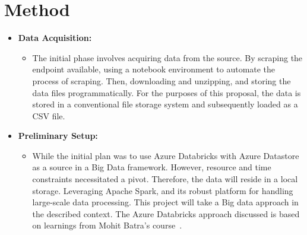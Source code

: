 \documentclass[12pt, a4paper]{article}
\begin{document}
    \section*{Method}
    \label{sec:method}
        \begin{itemize}
            \item \textbf{Data Acquisition:}
            \begin{itemize}
                    \item The initial phase involves acquiring data from the source.\newline
                    By scraping the endpoint available, using a notebook environment to automate the process of scraping. Then, downloading and unzipping, and storing the data files programmatically.\newline
                    For the purposes of this proposal, the data is stored in a conventional file storage system and subsequently loaded as a CSV file.
            \end{itemize}

            \item \textbf{Preliminary Setup:}
            \begin{itemize}
                    \item While the initial plan was to use Azure Databricks with Azure Datastore as a source in a Big Data framework.
                    However, resource and time constraints necessitated a pivot. Therefore, the data will reside in a local storage.
                    \newline Leveraging Apache Spark, and its robust platform for handling large-scale data processing.
                    This project will take a Big data approach in the described context.
                    \newline The Azure Databricks approach  discussed is based on learnings from Mohit Batra's course~\cite{Batra2022}.
            \end{itemize}


\end{itemize}
\end{document}
